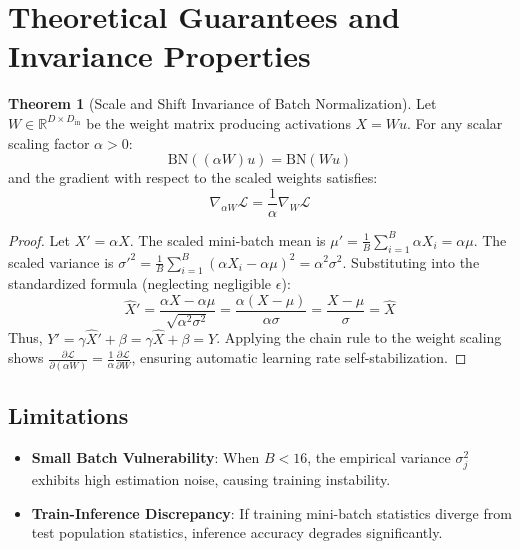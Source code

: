 \documentclass[11pt,a4paper]{article}
\theoremstyle{definition}
\newtheorem{theorem}{Theorem}[section]
\begin{document}
\section{Theoretical Guarantees and Invariance Properties}

\begin{theorem}[Scale and Shift Invariance of Batch Normalization]
Let $W \in \mathbb{R}^{D \times D_{\text{in}}}$ be the weight matrix producing activations $X = W u$. For any scalar scaling factor $\alpha > 0$:
\begin{equation}
\text{BN}((\alpha W) u) = \text{BN}(W u)
\end{equation}
and the gradient with respect to the scaled weights satisfies:
\begin{equation}
\nabla_{\alpha W} \mathcal{L} = \frac{1}{\alpha} \nabla_W \mathcal{L}
\end{equation}
\end{theorem}

\begin{proof}
Let $X' = \alpha X$. The scaled mini-batch mean is $\mu' = \frac{1}{B} \sum_{i=1}^B \alpha X_i = \alpha \mu$. The scaled variance is $\sigma'^2 = \frac{1}{B} \sum_{i=1}^B (\alpha X_i - \alpha \mu)^2 = \alpha^2 \sigma^2$.
Substituting into the standardized formula (neglecting negligible $\epsilon$):
\begin{equation}
\hat{X}' = \frac{\alpha X - \alpha \mu}{\sqrt{\alpha^2 \sigma^2}} = \frac{\alpha (X - \mu)}{\alpha \sigma} = \frac{X - \mu}{\sigma} = \hat{X}
\end{equation}
Thus, $Y' = \gamma \hat{X}' + \beta = \gamma \hat{X} + \beta = Y$. Applying the chain rule to the weight scaling shows $\frac{\partial \mathcal{L}}{\partial (\alpha W)} = \frac{1}{\alpha} \frac{\partial \mathcal{L}}{\partial W}$, ensuring automatic learning rate self-stabilization.
\end{proof}

\subsection{Limitations}
\begin{itemize}
    \item \textbf{Small Batch Vulnerability}: When $B < 16$, the empirical variance $\sigma_j^2$ exhibits high estimation noise, causing training instability.
    \item \textbf{Train-Inference Discrepancy}: If training mini-batch statistics diverge from test population statistics, inference accuracy degrades significantly.
\end{itemize}
\end{document}

